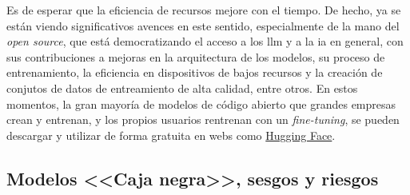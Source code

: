 Es de esperar que la eficiencia de recursos mejore con el tiempo. De hecho, ya se están viendo significativos avences en este sentido, especialmente de la mano del \textit{open source}, que está democratizando el acceso a los \gls{llm} y a la \gls{ia} en general, con sus contribuciones a mejoras en la arquitectura de los modelos, su proceso de entrenamiento, la eficiencia en dispositivos de bajos recursos y la creación de conjutos de datos de entreamiento de alta calidad, entre otros. En estos momentos, la gran mayoría de modelos de código abierto que grandes empresas crean y entrenan, y los propios usuarios rentrenan con un \textit{fine-tuning}, se pueden descargar y utilizar de forma gratuita en webs como \href{https://huggingface.co/}{Hugging Face}.




\subsection{Modelos <<Caja negra>>, sesgos y riesgos}
